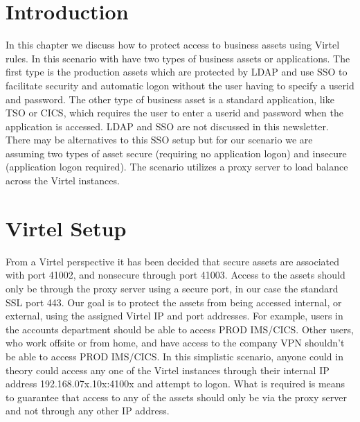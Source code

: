 \documentclass[letterpaper,10pt,english]{sphinxmanual}
\begin{document}
\section{Introduction}
\label{\detokenize{connectivity_guide:id78}}
\sphinxAtStartPar
In this chapter we discuss how to protect access to business assets using Virtel rules. In this scenario with have two types of business assets or applications. The first type is the production assets which are protected by LDAP and use SSO to facilitate security and automatic logon without the user having to specify a userid and password. The other type of business asset is a standard application, like TSO or CICS, which requires the user to enter a userid and password when the application is accessed. LDAP and SSO are not discussed in this newsletter. There may be alternatives to this SSO setup but for our scenario we are assuming two types of asset \textendash{} secure (requiring no application logon) and insecure (application logon required). The scenario utilizes a proxy server to load balance across the Virtel instances.

\sphinxAtStartPar
{}

\newpage

\ignorespaces 

\section{Virtel Setup}
\label{\detokenize{connectivity_guide:virtel-setup}}\label{\detokenize{connectivity_guide:index-194}}
\sphinxAtStartPar
From a Virtel perspective it has been decided that secure assets are associated with port 41002, and non\sphinxhyphen{}secure through port 41003. Access to the assets should only be through the proxy server using a secure port, in our case the standard SSL port 443. Our goal is to protect the assets from being accessed internal, or external, using the assigned Virtel IP
and port addresses. For example, users in the accounts department should be able to access PROD IMS/CICS. Other users, who work offsite or from home, and have access to the company VPN shouldn’t be able to access PROD IMS/CICS. In this simplistic scenario, anyone could in theory could access any one of the Virtel instances through their internal IP address \textendash{} 192.168.07x.10x:4100x and attempt to logon. What is required is means to guarantee that access to any of the assets should only be via the proxy server and not through any other IP address.
\end{document}

